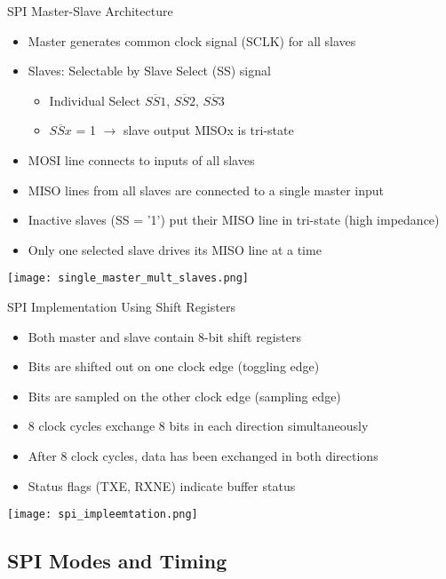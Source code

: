 \begin{concept}{SPI Master-Slave Architecture}
\begin{itemize}
    \item Master generates common clock signal (SCLK) for all slaves
    \item Slaves: Selectable by Slave Select (SS) signal 
        \begin{itemize}
            \item Individual Select $\overline{SS1}$, $\overline{SS2}$, $\overline{SS3}$
            \item $\overline{SSx}$ = 1 $\rightarrow$ slave output MISOx is tri-state 
        \end{itemize}
    \item MOSI line connects to inputs of all slaves
    \item MISO lines from all slaves are connected to a single master input
    \item Inactive slaves (SS = '1') put their MISO line in tri-state (high impedance)
    \item Only one selected slave drives its MISO line at a time
\end{itemize}
\texttt{[image: single\_master\_mult\_slaves.png]}
\end{concept}

\multend

\begin{definition}{SPI Implementation Using Shift Registers}
\begin{itemize}
    \item Both master and slave contain 8-bit shift registers
    \item Bits are shifted out on one clock edge (toggling edge)
    \item Bits are sampled on the other clock edge (sampling edge)
    \item 8 clock cycles exchange 8 bits in each direction simultaneously
    \item After 8 clock cycles, data has been exchanged in both directions
    \item Status flags (TXE, RXNE) indicate buffer status
\end{itemize}
\texttt{[image: spi\_impleemtation.png]}
\end{definition}




\subsection{SPI Modes and Timing}

